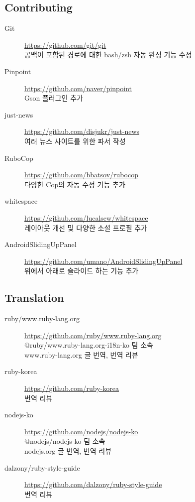 \documentclass[a4paper,10pt]{article}
\begin{document}
\subsection{Contributing}
\begin{description}
  \item[Git] \url{https://github.com/git/git} \\
    공백이 포함된 경로에 대한 bash/zsh 자동 완성 기능 수정
  \item[Pinpoint] \url{https://github.com/naver/pinpoint} \\
    Gson 플러그인 추가
  \item[just-news] \url{https://github.com/disjukr/just-news} \\
    여러 뉴스 사이트를 위한 파서 작성
  \item[RuboCop] \url{https://github.com/bbatsov/rubocop} \\
    다양한 Cop의 자동 수정 기능 추가
  \item[whitespace] \url{https://github.com/lucalsew/whitespace} \\
    레이아웃 개선 및 다양한 소셜 프로필 추가
  \item[AndroidSlidingUpPanel] \url{https://github.com/umano/AndroidSlidingUpPanel} \\
    위에서 아래로 슬라이드 하는 기능 추가
\end{description}

\subsection{Translation}
\begin{description}
  \item[ruby/www.ruby-lang.org] \url{https://github.com/ruby/www.ruby-lang.org} \\
    @ruby/www.ruby-lang.org-i18n-ko 팀 소속 \\
    www.ruby-lang.org 글 번역, 번역 리뷰
  \item[ruby-korea] \url{https://github.com/ruby-korea} \\
    번역 리뷰
  \item[nodejs-ko] \url{https://github.com/nodejs/nodejs-ko} \\
    @nodejs/nodejs-ko 팀 소속 \\
    nodejs.org 글 번역, 번역 리뷰
  \item[dalzony/ruby-style-guide] \url{https://github.com/dalzony/ruby-style-guide} \\
    번역 리뷰
\end{description}


\end{document}
